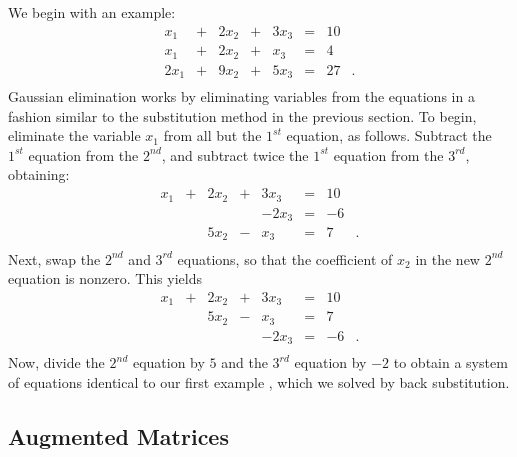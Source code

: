 \documentclass{ximera}
\begin{document}
We begin with an example:
\begin{equation}
\begin{array}{rcrcrcrl}
  x_1 & + & 2x_2 & + & 3x_3 & = &  10  & \\
  x_1 & + & 2x_2 & + &  x_3 & = &   4  & \\
 2x_1 & + & 9x_2 & + & 5x_3 & = &  27  & .\\
\end{array}
\end{equation}
Gaussian elimination works by eliminating variables from the
equations in a fashion similar to the substitution method in the
previous section.  To begin, eliminate the variable $x_1$ from
all but the $1^{st}$ equation, as follows.  Subtract the
$1^{st}$ equation from the $2^{nd}$, and subtract twice the
$1^{st}$ equation from the $3^{rd}$, obtaining:
\begin{equation}
\begin{array}{rcrcrcrl}
  x_1 & + & 2x_2 & + & 3x_3 & = &  10  & \\
      &   &      &   &-2x_3 & = &  -6  & \\
      &   & 5x_2 & - &  x_3 & = &   7  & .\\
\end{array}
\end{equation}
Next, swap the $2^{nd}$ and $3^{rd}$ equations, so that
the coefficient of $x_2$ in the new $2^{nd}$ equation is nonzero.
This yields
\begin{equation}
\begin{array}{rcrcrcrl}
  x_1 & + & 2x_2 & + & 3x_3 & = &  10  & \\
      &   & 5x_2 & - &  x_3 & = &   7  & \\
      &   &      &   &-2x_3 & = &  -6  & .\\
\end{array}
\end{equation}
Now, divide the $2^{nd}$ equation by $5$ and the $3^{rd}$
equation by $-2$ to obtain a system of equations identical to
our first example , which we solved by back
substitution.


\subsection*{Augmented Matrices}
\end{document}
